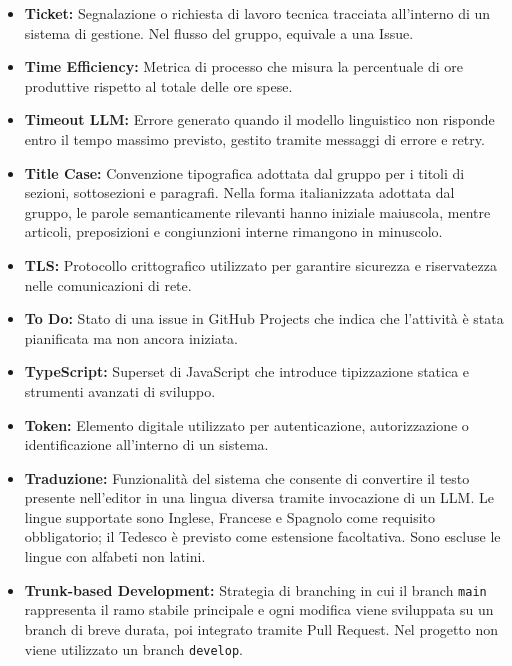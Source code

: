\begin{itemize}[leftmargin=*]
            creazione del task e utilizzata come riferimento per il monitoraggio
            dell'avanzamento.
      \item \textbf{Ticket:} Segnalazione o richiesta di lavoro tecnica tracciata all'interno di un sistema di gestione. Nel flusso del gruppo, equivale a una Issue.
      \item \textbf{Time Efficiency:} Metrica di processo che misura la percentuale di
      ore produttive rispetto al totale delle ore spese.
      \item \textbf{Timeout LLM:} Errore generato quando il modello linguistico non risponde entro il tempo massimo previsto, gestito tramite messaggi di errore e retry.
      \item \textbf{Title Case:} Convenzione tipografica adottata dal gruppo per i
            titoli di sezioni, sottosezioni e paragrafi. Nella forma italianizzata adottata
            dal gruppo, le parole semanticamente rilevanti hanno iniziale maiuscola, mentre
            articoli, preposizioni e congiunzioni interne rimangono in minuscolo.
      \item \textbf{TLS:} Protocollo crittografico utilizzato per garantire sicurezza e riservatezza nelle comunicazioni di rete.
      \item \textbf{To Do:} Stato di una issue in GitHub Projects che indica che l'attività è stata pianificata ma non ancora iniziata.
      \item \textbf{TypeScript:} Superset di JavaScript che introduce tipizzazione statica e strumenti avanzati di sviluppo.
      \item \textbf{Token:} Elemento digitale utilizzato per autenticazione, autorizzazione o identificazione all’interno di un sistema.
      \item \textbf{Traduzione:} Funzionalità del sistema che consente di
            convertire il testo presente nell'editor in una lingua diversa
            tramite invocazione di un LLM. Le lingue supportate sono Inglese,
            Francese e Spagnolo come requisito obbligatorio; il Tedesco è
            previsto come estensione facoltativa. Sono escluse le lingue con
            alfabeti non latini.
      \item \textbf{Trunk-based Development:} Strategia di branching in cui il branch
      \texttt{main} rappresenta il ramo stabile principale e ogni modifica viene
      sviluppata su un branch di breve durata, poi integrato tramite Pull Request.
      Nel progetto non viene utilizzato un branch \texttt{develop}.
\end{itemize}
 
